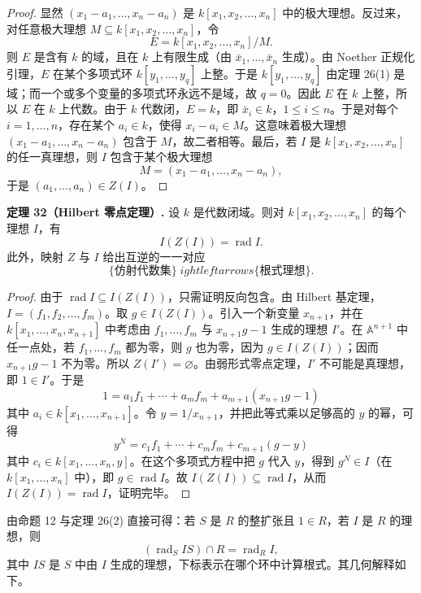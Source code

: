 \begin{proof}
	显然 $(x_1-a_1,
	\ldots,x_n-a_n)$ 是 $k[x_1,x_2,
	\ldots,x_n]$ 中的极大理想。反过来，对任意极大理想 $M\subseteq k[x_1,x_2,
	\ldots,x_n]$，令
	\[
	E=k[x_1,x_2,
	\ldots,x_n]/M.
	\]
	则 $E$ 是含有 $k$ 的域，且在 $k$ 上有限生成（由 $\bar x_1,
	\ldots,
	\bar x_n$ 生成）。由 Noether 正规化引理，$E$ 在某个多项式环 $k[y_1,
	\ldots,y_q]$ 上整。于是 $k[y_1,
	\ldots,y_q]$ 由定理 26(1) 是域；而一个或多个变量的多项式环永远不是域，故 $q=0$。因此 $E$ 在 $k$ 上整，所以 $E$ 在 $k$ 上代数。由于 $k$ 代数闭，$E=k$，即 $\bar x_i\in k$，$1\le i\le n$。于是对每个 $i=1,
	\ldots,n$，存在某个 $a_i\in k$，使得 $x_i-a_i\in M$。这意味着极大理想 $(x_1-a_1,
	\ldots,x_n-a_n)$ 包含于 $M$，故二者相等。最后，若 $I$ 是 $k[x_1,x_2,
	\ldots,x_n]$ 的任一真理想，则 $I$ 包含于某个极大理想
	\[
	M=(x_1-a_1,
	\ldots,x_n-a_n),
	\]
	于是 $(a_1,
	\ldots,a_n)\in Z(I)$。
\end{proof}

\noindent\textbf{定理 32（Hilbert 零点定理）.} 设 $k$ 是代数闭域。则对 $k[x_1,x_2,
\ldots,x_n]$ 的每个理想 $I$，有
\[
I(Z(I))=\operatorname{rad}I.
\]
此外，映射 $Z$ 与 $I$ 给出互逆的一一对应
\[
\{\text{仿射代数集}\}
\;
ightleftarrows
\{\text{根式理想}\}.
\]

\begin{proof}
	由于 $\operatorname{rad}I\subseteq I(Z(I))$，只需证明反向包含。由 Hilbert 基定理，$I=(f_1,f_2,
	\ldots,f_m)$。取 $g\in I(Z(I))$。引入一个新变量 $x_{n+1}$，并在 $k[x_1,
	\ldots,x_n,x_{n+1}]$ 中考虑由 $f_1,
	\ldots,f_m$ 与 $x_{n+1}g-1$ 生成的理想 $I'$。在 $\mathbb A^{n+1}$ 中任一点处，若 $f_1,
	\ldots,f_m$ 都为零，则 $g$ 也为零，因为 $g\in I(Z(I))$；因而 $x_{n+1}g-1$ 不为零。所以 $Z(I')=\varnothing$。由弱形式零点定理，$I'$ 不可能是真理想，即 $1\in I'$。于是
	\[
	1=a_1f_1+\cdots+a_mf_m+a_{m+1}(x_{n+1}g-1)
	\]
	其中 $a_i\in k[x_1,
	\ldots,x_{n+1}]$。令 $y=1/x_{n+1}$，并把此等式乘以足够高的 $y$ 的幂，可得
	\[
	y^N=c_1f_1+\cdots+c_mf_m+c_{m+1}(g-y)
	\]
	其中 $c_i\in k[x_1,
	\ldots,x_n,y]$。在这个多项式方程中把 $g$ 代入 $y$，得到 $g^N\in I$（在 $k[x_1,
	\ldots,x_n]$ 中），即 $g\in\operatorname{rad}I$。故 $I(Z(I))\subseteq\operatorname{rad}I$，从而 $I(Z(I))=\operatorname{rad}I$，证明完毕。
\end{proof}

由命题 12 与定理 26(2) 直接可得：若 $S$ 是 $R$ 的整扩张且 $1\in R$，若 $I$ 是 $R$ 的理想，则
\[
(\operatorname{rad}_S IS)\cap R=\operatorname{rad}_R I,
\]
其中 $IS$ 是 $S$ 中由 $I$ 生成的理想，下标表示在哪个环中计算根式。其几何解释如下。

